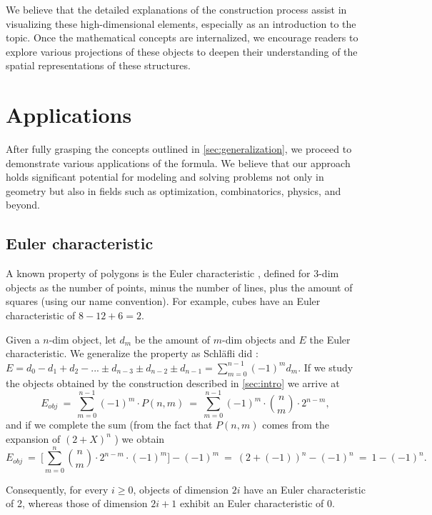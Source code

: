\documentclass{article}
\begin{document}
	We believe that the detailed explanations of the construction process assist in visualizing these high-dimensional elements, especially as an introduction to the topic. Once the mathematical concepts are internalized, we encourage readers to explore various projections of these objects to deepen their understanding of the spatial representations of these structures.
	
	\section{Applications \label{sec:apps}}
	
	After fully grasping the concepts outlined in \autoref{sec:generalization}, we proceed to demonstrate various applications of the formula. We believe that our approach holds significant potential for modeling and solving problems not only in geometry but also in fields such as optimization, combinatorics, physics, and beyond.
	
	\subsection{Euler characteristic \label{sec:euler}}
	
	A known property of polygons is the Euler characteristic \cite{euler}, defined for $3$-dim objects as the number of points, minus the number of lines, plus the amount of squares (using our name convention). For example, cubes have an Euler characteristic of $8 - 12 + 6 = 2$.

	Given a $n$-dim object, let $d_m$ be the amount of $m$-dim objects and $E$ the Euler characteristic. We generalize the property as Schläfli did \cite{coxeter1973regular}: $E=d_{0}-d_{1}+d_{2}- ... \pm d_{n-3}\pm d_{n-2}\pm d_{n-1} = \sum_{m=0}^{n-1}(-1)^{m}d_{m}$. If we study the objects obtained by the construction described in \autoref{sec:intro} we arrive at
	$$E_{obj} \ = \ \sum_{m=0}^{n-1}(-1)^{m} \cdot P(n,m)\ =\ \sum_{m=0}^{n-1}(-1)^{m} \cdot \binom{n}{m} \cdot 2^{n-m},$$
	and if we complete the sum (from the fact that $P(n,m)$ comes from the expansion of $(2 + X)^{n}$ \cite{coxeter1973regular}) we obtain
	$$E_{obj} \ =\ \Bigg[\sum_{m=0}^{n} \binom{n}{m} \cdot 2^{n-m} \cdot (-1)^{m}\Bigg] - (-1)^m \ = \ (2 + (-1))^{n}-(-1)^{n} \ = \ 1-(-1)^{n}.$$
	
	Consequently, for every $i \geq 0$, objects of dimension $2i$ have an Euler characteristic of 2, whereas those of dimension $2i+1$ exhibit an Euler characteristic of 0.
	
\end{document}
